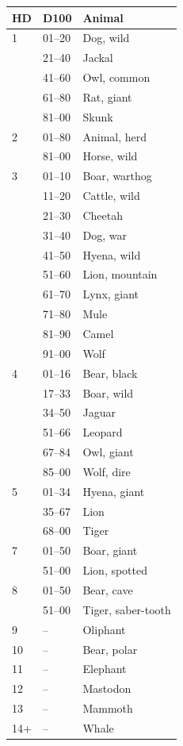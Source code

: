 \begin{multicols}{2}
\noindent
\begin{tabular}{|p{}|p{}|p{}|}
\hline
HD	& D100 	& Animal \\
\hline\hline
\rowcolor[gray]{.9}1	& 01--20	& Dog, wild \\
\rowcolor[gray]{.9}	& 21--40	& Jackal \\
\rowcolor[gray]{.9}	& 41--60	& Owl, common \\
\rowcolor[gray]{.9}	& 61--80	& Rat, giant \\
\rowcolor[gray]{.9}	& 81--00	& Skunk \\
2	& 01--80	& Animal, herd \\
	& 81--00	& Horse, wild \\
\rowcolor[gray]{.9}3	& 01--10	& Boar, warthog \\
\rowcolor[gray]{.9}	& 11--20	& Cattle, wild \\
\rowcolor[gray]{.9}	& 21--30	& Cheetah \\
\rowcolor[gray]{.9}	& 31--40	& Dog, war \\
\rowcolor[gray]{.9}	& 41--50	& Hyena, wild \\
\rowcolor[gray]{.9}	& 51--60	& Lion, mountain \\
\rowcolor[gray]{.9}	& 61--70	& Lynx, giant \\
\rowcolor[gray]{.9}	& 71--80	& Mule \\
\rowcolor[gray]{.9}	& 81--90	& Camel \\
\rowcolor[gray]{.9}	& 91--00	& Wolf \\
4	& 01--16	& Bear, black \\
	& 17--33	& Boar, wild \\
	& 34--50	& Jaguar \\
	& 51--66	& Leopard \\
	& 67--84	& Owl, giant \\
	& 85--00	& Wolf, dire \\
\rowcolor[gray]{.9}5	& 01--34	& Hyena, giant \\
\rowcolor[gray]{.9}	& 35--67	& Lion \\
\rowcolor[gray]{.9}	& 68--00	& Tiger \\
7	& 01--50	& Boar, giant \\
	& 51--00	& Lion, spotted \\
\rowcolor[gray]{.9}8	& 01--50	& Bear, cave \\
\rowcolor[gray]{.9}	& 51--00	& Tiger, saber-tooth \\
9	& --		& Oliphant \\
\rowcolor[gray]{.9}10	& --		& Bear, polar \\
11	& --		& Elephant \\
\rowcolor[gray]{.9}12	& --		& Mastodon \\
13	& --		& Mammoth \\
\rowcolor[gray]{.9}14+	& --		& Whale \\
\hline
\end{tabular}


\end{multicols}
